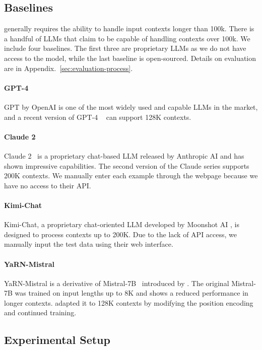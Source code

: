 \subsection{Baselines}
\OURSSPACE generally requires the ability to handle input contexts longer than 100k. There is a handful of LLMs that claim to be capable of handling contexts over 100k. We include four baselines. The first three are proprietary LLMs as we do not have access to the model, while the last baseline is open-sourced. Details on evaluation are in Appendix.~\ref{sec:evaluation-process}.

\paragraph{GPT-4} 
GPT by OpenAI is one of the most widely used and capable LLMs in the market, and a recent version of GPT-4 ~\citep{gpt4turbo} can support 128K contexts. 

\paragraph{Claude 2}
Claude 2~\citep{claude2} is a proprietary chat-based LLM released by Anthropic AI and has shown impressive capabilities. The second version of the Claude series supports 200K contexts. We manually enter each example through the webpage because we have no access to their API.

\paragraph{Kimi-Chat}
Kimi-Chat, a proprietary chat-oriented LLM developed by Moonshot AI \cite{kimi}, is designed to process contexts up to 200K. Due to the lack of API access, we manually input the test data using their web interface.

\paragraph{YaRN-Mistral}
YaRN-Mistral is a derivative of Mistral-7B~\citep{mistral} introduced by \citet{yarn}. The original Mistral-7B was trained on input lengths up to 8K and shows a reduced performance in longer contexts. \citet{yarn} adapted it to 128K contexts by modifying the position encoding and continued training.

\subsection{Experimental Setup}
